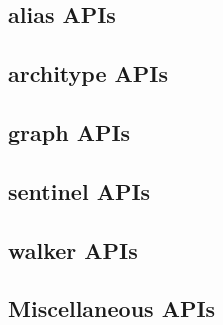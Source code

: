 \subsection{alias APIs}
\subsection{architype APIs}
\subsection{graph APIs}
\subsection{sentinel APIs}
\subsection{walker APIs}
\subsection{Miscellaneous APIs}